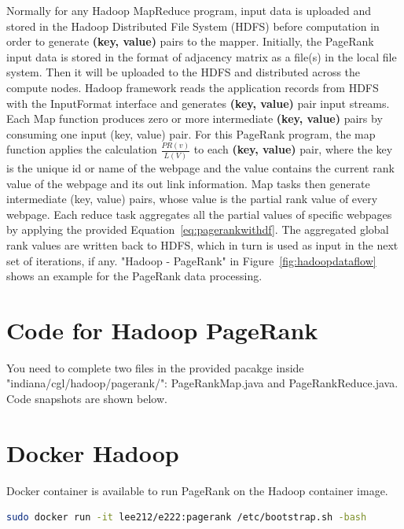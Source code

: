 Normally for any Hadoop MapReduce program, input data is uploaded and stored in
the Hadoop Distributed File System (HDFS) before computation in order to
generate \textbf{(key, value)} pairs to the mapper. Initially, the PageRank
input data is stored in the format of adjacency matrix as a file(s) in the
local file system. Then it will be uploaded to the HDFS and distributed across
the compute nodes. Hadoop framework reads the application records from HDFS
with the InputFormat interface and generates \textbf{(key, value)} pair input
streams. Each Map function produces zero or more intermediate \textbf{(key,
value)} pairs by consuming one input (key, value) pair. For this PageRank
program, the map function applies the calculation $\frac{PR(v)}{L(V)}$ to each
\textbf{(key, value)} pair, where the key is the unique id or name of the
webpage and the value contains the current rank value of the webpage and its
out link information. Map tasks then generate intermediate (key, value) pairs,
whose value is the partial rank value of every webpage. Each reduce task
aggregates all the partial values of specific webpages by applying the provided
Equation~\ref{eq:pagerankwithdf}. The aggregated global rank values are written
back to HDFS, which in turn is used as input in the next set of iterations, if
any. "Hadoop - PageRank" in Figure~\ref{fig:hadoopdataflow} shows an example
for the PageRank data processing.


\section{Code for Hadoop PageRank}

You need to complete two files in the provided pacakge inside
"indiana/cgl/hadoop/pagerank/": PageRankMap.java and PageRankReduce.java. Code
snapshots are shown below.




\section{Docker Hadoop}
Docker container is available to run PageRank on the Hadoop container image.

\begin{lstlisting}[language=bash]
sudo docker run -it lee212/e222:pagerank /etc/bootstrap.sh -bash
\end{lstlisting}

